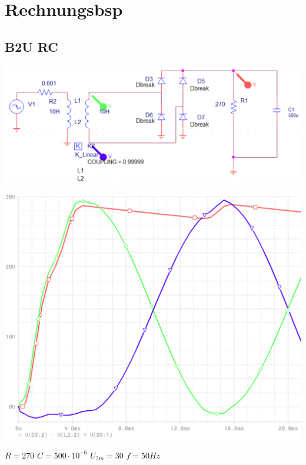 \section{Rechnungsbsp}
\subsection*{B2U RC}
\begin{minipage}{0.4\linewidth}
    \includegraphics[width=\linewidth]{images/Rechnungsbsp/B2URC}
\end{minipage}
\begin{minipage}{0.2\linewidth}
    \includegraphics[width=\linewidth]{images/Rechnungsbsp/B2URCKl}
\end{minipage}
\begin{minipage}{5cm}
   $ R = 270 $ \newline
   $ C = 500 \cdot 10^{-6} $\newline
   $ U_{2m} = 30 $ \newline
   $ f = 50 Hz $   
\end{minipage}
